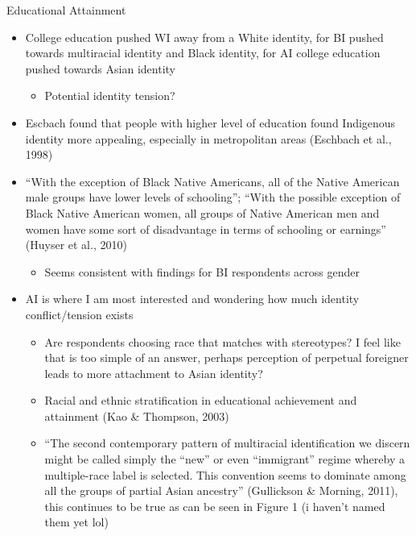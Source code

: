 \documentclass[
  12pt,
  letterpaper,
]{article}
\providecommand{\tightlist}{%
  \setlength{\itemsep}{0pt}\setlength{\parskip}{0pt}}\usepackage{longtable,booktabs,array}
\begin{document}
Educational Attainment

\begin{itemize}
\item
  College education pushed WI away from a White identity, for BI pushed
  towards multiracial identity and Black identity, for AI college
  education pushed towards Asian identity

  \begin{itemize}
  \tightlist
  \item
    Potential identity tension?
  \end{itemize}
\item
  Escbach found that people with higher level of education found
  Indigenous identity more appealing, especially in metropolitan areas
  (Eschbach et al., 1998)
\item
  ``With the exception of Black Native Americans, all of the Native
  American male groups have lower levels of schooling''; ``With the
  possible exception of Black Native American women, all groups of
  Native American men and women have some sort of disadvantage in terms
  of schooling or earnings'' (Huyser et al., 2010)

  \begin{itemize}
  \tightlist
  \item
    Seems consistent with findings for BI respondents across gender
  \end{itemize}
\item
  AI is where I am most interested and wondering how much identity
  conflict/tension exists

  \begin{itemize}
  \item
    Are respondents choosing race that matches with stereotypes? I feel
    like that is too simple of an answer, perhaps perception of
    perpetual foreigner leads to more attachment to Asian identity?
  \item
    Racial and ethnic stratification in educational achievement and
    attainment (Kao \& Thompson, 2003)
  \item
    ``The second contemporary pattern of multiracial identification we
    discern might be called simply the ``new'' or even ``immigrant''
    regime whereby a multiple-race label is selected. This convention
    seems to dominate among all the groups of partial Asian ancestry''
    (Gullickson \& Morning, 2011), this continues to be true as can be
    seen in Figure 1 (i haven't named them yet lol)
  \end{itemize}
\end{itemize}
\end{document}
